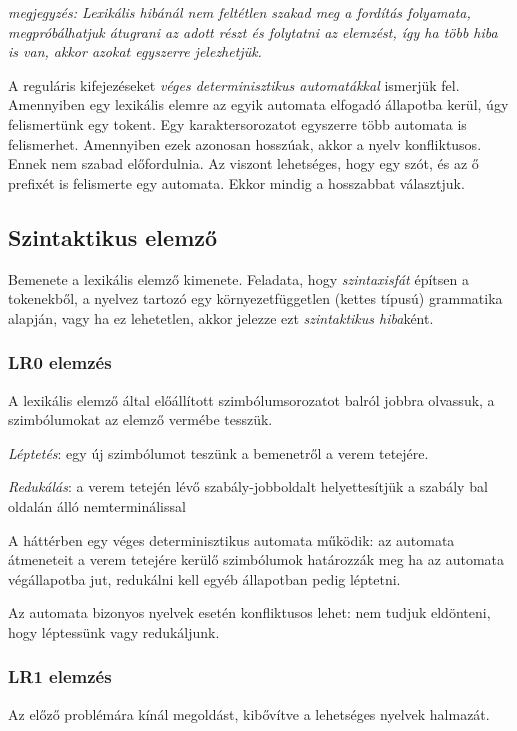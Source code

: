 \documentclass[margin=0px]{article}
\begin{document}
\textit{megjegyzés: Lexikális hibánál nem feltétlen szakad meg a fordítás folyamata, megpróbálhatjuk átugrani az adott részt és folytatni az elemzést, így ha több hiba is van, akkor azokat egyszerre jelezhetjük.}

A reguláris kifejezéseket \textit{véges determinisztikus automatákkal} ismerjük fel. Amennyiben egy lexikális elemre az egyik automata elfogadó állapotba kerül, úgy felismertünk egy tokent. Egy karaktersorozatot egyszerre több automata is felismerhet. Amennyiben ezek azonosan hosszúak, akkor a nyelv konfliktusos. Ennek nem szabad előfordulnia. Az viszont lehetséges, hogy egy szót, és az ő prefixét is felismerte egy automata. Ekkor mindig a hosszabbat választjuk.

\subsection{Szintaktikus elemző}

Bemenete a lexikális elemző kimenete. Feladata, hogy \textit{szintaxisfát} építsen a tokenekből, a nyelvez tartozó egy környezetfüggetlen (kettes típusú) grammatika alapján, vagy ha ez lehetetlen, akkor jelezze ezt \textit{szintaktikus hiba}ként.

\subsubsection{LR0 elemzés}

A lexikális elemző által előállított szimbólumsorozatot balról
jobbra olvassuk, a szimbólumokat az elemző vermébe tesszük.

\textit{Léptetés}: egy új szimbólumot teszünk a bemenetről a verem
tetejére.

\textit{Redukálás}: a verem tetején lévő szabály-jobboldalt
helyettesítjük a szabály bal oldalán álló nemterminálissal

A háttérben egy véges determinisztikus automata működik:
az automata átmeneteit a verem tetejére kerülő szimbólumok
határozzák meg
ha az automata végállapotba jut, redukálni kell
egyéb állapotban pedig léptetni.

Az automata bizonyos nyelvek esetén konfliktusos lehet: nem tudjuk eldönteni, hogy léptessünk vagy redukáljunk.

\subsubsection{LR1 elemzés}

Az előző problémára kínál megoldást, kibővítve a lehetséges nyelvek halmazát.
\end{document}
